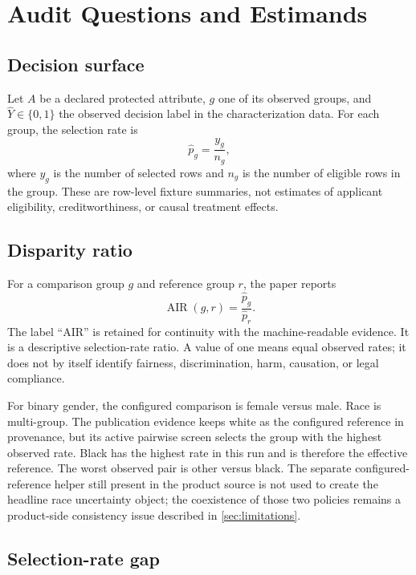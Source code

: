 \section{Audit Questions and Estimands}

\subsection{Decision surface}

Let $A$ be a declared protected attribute, $g$ one of its observed groups, and
$\widehat{Y}\in\{0,1\}$ the observed decision label in the characterization data. For each group,
the selection rate is
\begin{equation}
  \widehat p_g = \frac{y_g}{n_g},
  \label{eq:selection-rate}
\end{equation}
where $y_g$ is the number of selected rows and $n_g$ is the number of eligible rows in the group.
These are row-level fixture summaries, not estimates of applicant eligibility, creditworthiness, or
causal treatment effects.

\subsection{Disparity ratio}

For a comparison group $g$ and reference group $r$, the paper reports
\begin{equation}
  \operatorname{AIR}(g,r) = \frac{\widehat p_g}{\widehat p_r}.
  \label{eq:air}
\end{equation}
The label ``AIR'' is retained for continuity with the machine-readable evidence. It is a descriptive
selection-rate ratio. A value of one means equal observed rates; it does not by itself identify
fairness, discrimination, harm, causation, or legal compliance.

For binary gender, the configured comparison is female versus male. Race is multi-group. The
publication evidence keeps white as the configured reference in provenance, but its active
pairwise screen selects the group with the highest observed rate. Black has the highest rate in
this run and is therefore the effective reference. The worst observed pair is other versus black.
The separate configured-reference helper still present in the product source is not used to create
the headline race uncertainty object; the coexistence of those two policies remains a product-side
consistency issue described in \autoref{sec:limitations}.

\subsection{Selection-rate gap}

